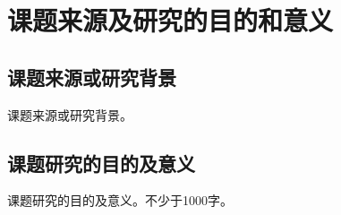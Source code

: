 \section{课题来源及研究的目的和意义}

\subsection{课题来源或研究背景}

课题来源或研究背景。

\subsection{课题研究的目的及意义}

课题研究的目的及意义。不少于1000字。




